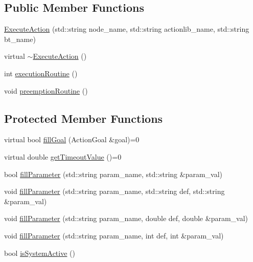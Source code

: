 \subsection*{Public Member Functions}
\begin{DoxyCompactItemize}
\item 
\hyperlink{classsarafun_1_1ExecuteAction_acbe4336af2941a52a96aaaceb7e801cb_acbe4336af2941a52a96aaaceb7e801cb}{Execute\-Action} (std\-::string node\-\_\-name, std\-::string actionlib\-\_\-name, std\-::string bt\-\_\-name)
\item 
virtual \hyperlink{classsarafun_1_1ExecuteAction_a194ac46f85d7c70c0aa4f09a0c2941ae_a194ac46f85d7c70c0aa4f09a0c2941ae}{$\sim$\-Execute\-Action} ()
\item 
int \hyperlink{classsarafun_1_1ExecuteAction_ae5e3d1f2779c12923ccdc6289ebba25a_ae5e3d1f2779c12923ccdc6289ebba25a}{execution\-Routine} ()
\item 
void \hyperlink{classsarafun_1_1ExecuteAction_a4075792022071239c6e335c32c70ad2e_a4075792022071239c6e335c32c70ad2e}{preemption\-Routine} ()
\end{DoxyCompactItemize}
\subsection*{Protected Member Functions}
\begin{DoxyCompactItemize}
\item 
virtual bool \hyperlink{classsarafun_1_1ExecuteAction_a6dd9c0f013d15a17d7e7ce8dbe40a436_a6dd9c0f013d15a17d7e7ce8dbe40a436}{fill\-Goal} (Action\-Goal \&goal)=0
\item 
virtual double \hyperlink{classsarafun_1_1ExecuteAction_aba6cfa8a8ce19e735eb6394424df6d17_aba6cfa8a8ce19e735eb6394424df6d17}{get\-Timeout\-Value} ()=0
\item 
bool \hyperlink{classsarafun_1_1ExecuteAction_ac1c8c1ac7392b0ebc8d095d6f6d336e3_ac1c8c1ac7392b0ebc8d095d6f6d336e3}{fill\-Parameter} (std\-::string param\-\_\-name, std\-::string \&param\-\_\-val)
\item 
void \hyperlink{classsarafun_1_1ExecuteAction_a78aa73f154cebe28d4c2fa11ec6a07cf_a78aa73f154cebe28d4c2fa11ec6a07cf}{fill\-Parameter} (std\-::string param\-\_\-name, std\-::string def, std\-::string \&param\-\_\-val)
\item 
void \hyperlink{classsarafun_1_1ExecuteAction_a0c5d656feaf29da583e87f8389570e7d_a0c5d656feaf29da583e87f8389570e7d}{fill\-Parameter} (std\-::string param\-\_\-name, double def, double \&param\-\_\-val)
\item 
void \hyperlink{classsarafun_1_1ExecuteAction_a0ab753300e7535025e7d0508335241a6_a0ab753300e7535025e7d0508335241a6}{fill\-Parameter} (std\-::string param\-\_\-name, int def, int \&param\-\_\-val)
\item 
bool \hyperlink{classsarafun_1_1ExecuteAction_ab9adb2cd743cb8e783fe2a927c94232b_ab9adb2cd743cb8e783fe2a927c94232b}{is\-System\-Active} ()
\end{DoxyCompactItemize}
